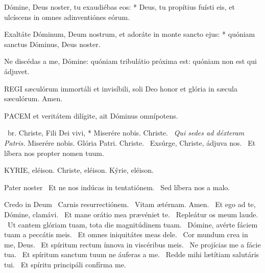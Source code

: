 Dómine, Deus noster, tu exaudiébas eos: * Deus, tu propítius fuísti eis, et ulcíscens in omnes adinventiónes eórum.

Exaltáte Dóminum, Deum nostrum, et adoráte in monte sancto ejus: * quóniam sanctus Dóminus, Deus noster.


 Ne discédas a me, Dómine: quóniam tribulátio próxima est: quóniam non est qui ádjuvet.



\lettrine[lines=2]{R}{EGI} sæculórum immortáli et invisíbili, soli Deo honor et glória in sæcula sæculórum. Amen.



\lettrine[lines=2]{P}{ACEM} et veritátem dilígite, ait Dóminus omnípotens.

\R\ br. Christe, Fili Dei vivi, * Miserére nobis. Christe. \V\ \textit{Qui sedes ad déxteram Patris.} Miserére nobis. Glória Patri. Christe. \V\ Exsúrge, Christe, ádjuva nos. \R\ Et líbera nos propter nomen tuum.


KYRIE, eléison. Christe, eléison. Kýrie, eléison.

Pater noster  \V\ Et ne nos indúcas in tentatiónem. \R\ Sed líbera nos a malo.

Credo in Deum  \V\ Carnis resurrectiónem. \R\ Vitam ætérnam. Amen. \V\ Et ego ad te, Dómine, clamávi. \R\ Et mane orátio mea prævéniet te. \V\ Repleátur os meum laude. \R\ Ut cantem glóriam tuam, tota die magnitúdinem tuam. \V\ Dómine, avérte fáciem tuam a peccátis meis. \R\ Et omnes iniquitátes meas dele. \V\ Cor mundum crea in me, Deus. \R\ Et spíritum rectum ínnova in viscéribus meis. \V\ Ne projícias me a fácie tua. \R\ Et spíritum sanctum tuum ne áuferas a me. \V\ Redde mihi lætítiam salutáris tui. \R\ Et spíritu principáli confírma me.


